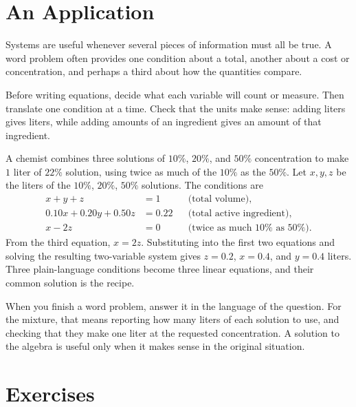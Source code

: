 \documentclass[12pt]{book}
\begin{document}
\section{An Application}

Systems are useful whenever several pieces of information must all be
true. A word problem often provides one condition about a total, another
about a cost or concentration, and perhaps a third about how the
quantities compare.

Before writing equations, decide what each variable will count or
measure. Then translate one condition at a time. Check that the units
make sense: adding liters gives liters, while adding amounts of an
ingredient gives an amount of that ingredient.


\begin{example}
A chemist combines three solutions of $10\%$, $20\%$, and $50\%$ concentration to
make $1$ liter of $22\%$ solution, using twice as much of the $10\%$ as the $50\%$.
Let $x,y,z$ be the liters of the $10\%$, $20\%$, $50\%$ solutions. The conditions are
\[
\begin{aligned}
x+y+z&=1 &&\text{(total volume)},\\
0.10x+0.20y+0.50z&=0.22 &&\text{(total active ingredient)},\\
x-2z&=0 &&\text{(twice as much }10\%\text{ as }50\%).
\end{aligned}
\]
From the third equation, $x=2z$. Substituting into the first two equations and solving
the resulting two-variable system gives $z=0.2$, $x=0.4$, and $y=0.4$ liters. Three
plain-language conditions become three linear equations, and their common solution is
the recipe.
\end{example}

When you finish a word problem, answer it in the language of the
question. For the mixture, that means reporting how many liters of each
solution to use, and checking that they make one liter at the requested
concentration. A solution to the algebra is useful only when it
makes sense in the original situation.

\section{Exercises}
\end{document}
